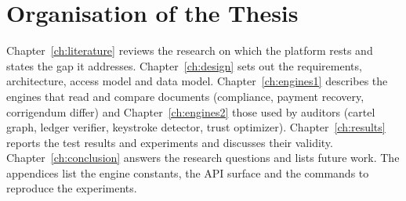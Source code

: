 \section{Organisation of the Thesis}
Chapter~\ref{ch:literature} reviews the research on which the platform rests and states the gap it addresses. Chapter~\ref{ch:design} sets out the requirements, architecture, access model and data model. Chapter~\ref{ch:engines1} describes the engines that read and compare documents (compliance, payment recovery, corrigendum differ) and Chapter~\ref{ch:engines2} those used by auditors (cartel graph, ledger verifier, keystroke detector, trust optimizer). Chapter~\ref{ch:results} reports the test results and experiments and discusses their validity. Chapter~\ref{ch:conclusion} answers the research questions and lists future work. The appendices list the engine constants, the API surface and the commands to reproduce the experiments.
